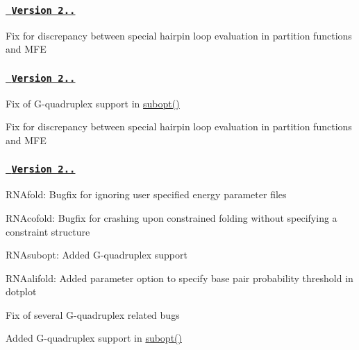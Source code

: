 \subsubsection*{\href{https://github.com/ViennaRNA/ViennaRNA/compare/v2.1.4...v2.1.5}{\texttt{ Version 2..}}}


\begin{DoxyItemize}
\item Fix for discrepancy between special hairpin loop evaluation in partition functions and M\+FE
\end{DoxyItemize}

\subsubsection*{\href{https://github.com/ViennaRNA/ViennaRNA/compare/v2.1.3...v2.1.4}{\texttt{ Version 2..}}}


\begin{DoxyItemize}
\item Fix of G-\/quadruplex support in \mbox{\hyperlink{group__subopt__wuchty_ga700f662506a233e42dd7fda74fafd40e}{subopt()}}
\item Fix for discrepancy between special hairpin loop evaluation in partition functions and M\+FE
\end{DoxyItemize}

\subsubsection*{\href{https://github.com/ViennaRNA/ViennaRNA/compare/v2.1.2...v2.1.3}{\texttt{ Version 2..}}}


\begin{DoxyItemize}
\item R\+N\+Afold\+: Bugfix for ignoring user specified energy parameter files
\item R\+N\+Acofold\+: Bugfix for crashing upon constrained folding without specifying a constraint structure
\item R\+N\+Asubopt\+: Added G-\/quadruplex support
\item R\+N\+Aalifold\+: Added parameter option to specify base pair probability threshold in dotplot
\item Fix of several G-\/quadruplex related bugs
\item Added G-\/quadruplex support in \mbox{\hyperlink{group__subopt__wuchty_ga700f662506a233e42dd7fda74fafd40e}{subopt()}}
\end{DoxyItemize}

